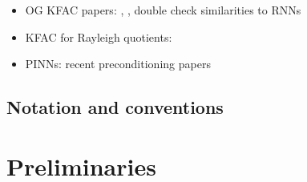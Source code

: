 \documentclass[11pt]{article}
\theoremstyle{definition}
\theoremstyle{plain}
\begin{document}
\begin{itemize}
    \item OG KFAC papers: \cite{martens2015optimizing}, \cite{martens2018kroneckerfactored}, double check similarities to RNNs 
    \item KFAC for Rayleigh quotients: 
    \item PINNs: recent preconditioning papers 
\end{itemize}

\subsection{Notation and conventions}

\section{Preliminaries}
\end{document}
